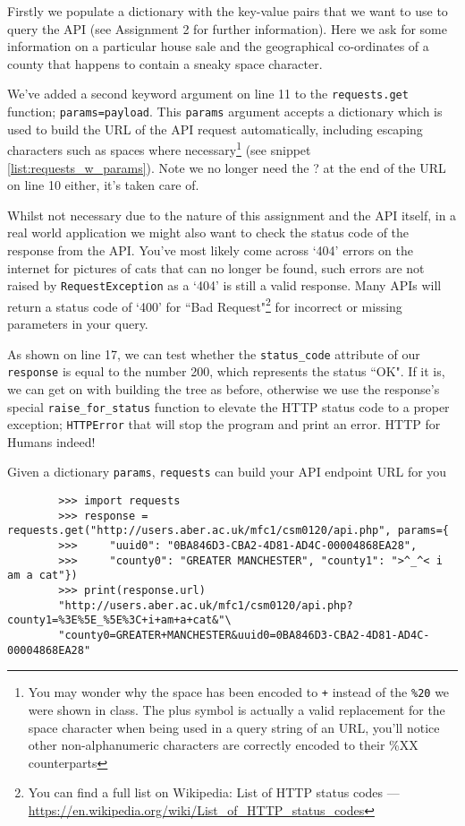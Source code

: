 \documentclass[a4paper]{article}
\begin{document}
Firstly we populate a dictionary with the key-value pairs that we want to use to
query the API (see Assignment 2 for further information). Here we ask for some
information on a particular house sale and the geographical co-ordinates of a
county that happens to contain a sneaky space character.

We've added a second keyword argument on line 11 to the \texttt{requests.get} function;
\texttt{params=payload}. This \texttt{params} argument accepts a dictionary which
is used to build the URL of the API request automatically, including escaping
characters such as spaces where necessary\footnote{You may wonder why the space has
been encoded to \texttt{+} instead of the \texttt{\%20} we were shown in class. The plus
symbol is actually a valid replacement for the space character when being used in
a query string of an URL, you'll notice other non-alphanumeric characters are correctly
encoded to their \%XX counterparts} (see snippet \ref{list:requests_w_params}).
Note we no longer need the ? at the end of the URL on line 10 either, it's taken care of.

Whilst not necessary due to the nature of this assignment and the API itself,
in a real world application we might also want to check
the status code of the response from the API. You've most likely come across `404' errors
on the internet for pictures of cats that can no longer be found, such errors are not raised
by \texttt{RequestException} as a `404' is still a valid response. Many APIs will return a status
code of `400' for ``Bad Request"\footnote{You can
find a full list on Wikipedia: List of HTTP status codes --- {\href{https://en.wikipedia.org/wiki/List\_of\_HTTP\_status\_codes}{https://en.wikipedia.org/wiki/List\_of\_HTTP\_status\_codes}}}
for incorrect or missing parameters in your query.

As shown on line 17, we can test whether the \texttt{status\_code} attribute of our
\texttt{response} is equal to the number 200, which represents the status ``OK".
If it is, we can get on with building the tree as before, otherwise we use the
response's special \texttt{raise\_for\_status} function to elevate the HTTP status
code to a proper exception; \texttt{HTTPError} that will stop the program and print
an error. HTTP for Humans indeed!
\begin{listing}[H]
    \caption[]{Given a dictionary \texttt{params}, \texttt{requests} can build your API endpoint URL for you}
    \label{list:requests_w_params}
    \begin{verbatim}
        >>> import requests
        >>> response = requests.get("http://users.aber.ac.uk/mfc1/csm0120/api.php", params={
        >>>     "uuid0": "0BA846D3-CBA2-4D81-AD4C-00004868EA28",
        >>>     "county0": "GREATER MANCHESTER", "county1": ">^_^< i am a cat"})
        >>> print(response.url)
        "http://users.aber.ac.uk/mfc1/csm0120/api.php?county1=%3E%5E_%5E%3C+i+am+a+cat&"\
        "county0=GREATER+MANCHESTER&uuid0=0BA846D3-CBA2-4D81-AD4C-00004868EA28"

    \end{verbatim}
\end{listing}
\end{document}

